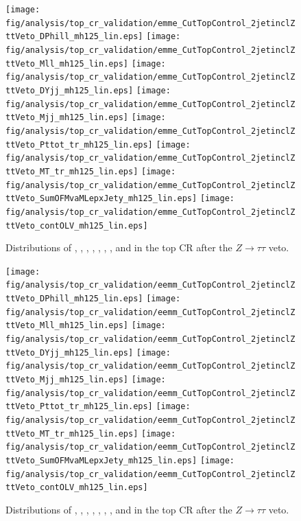 \begin{figure}[h]
  \centering
   \texttt{[image: fig/analysis/top\_cr\_validation/emme\_CutTopControl\_2jetinclZttVeto\_DPhill\_mh125\_lin.eps]}
   \texttt{[image: fig/analysis/top\_cr\_validation/emme\_CutTopControl\_2jetinclZttVeto\_Mll\_mh125\_lin.eps]}
   \texttt{[image: fig/analysis/top\_cr\_validation/emme\_CutTopControl\_2jetinclZttVeto\_DYjj\_mh125\_lin.eps]}
   \texttt{[image: fig/analysis/top\_cr\_validation/emme\_CutTopControl\_2jetinclZttVeto\_Mjj\_mh125\_lin.eps]}
   \texttt{[image: fig/analysis/top\_cr\_validation/emme\_CutTopControl\_2jetinclZttVeto\_Pttot\_tr\_mh125\_lin.eps]}
   \texttt{[image: fig/analysis/top\_cr\_validation/emme\_CutTopControl\_2jetinclZttVeto\_MT\_tr\_mh125\_lin.eps]}
   \texttt{[image: fig/analysis/top\_cr\_validation/emme\_CutTopControl\_2jetinclZttVeto\_SumOFMvaMLepxJety\_mh125\_lin.eps]}
   \texttt{[image: fig/analysis/top\_cr\_validation/emme\_CutTopControl\_2jetinclZttVeto\_contOLV\_mh125\_lin.eps]}
   \caption{Distributions
   of \dphill, \mll, \dyjj, \mjj, \pTtot, \mT, \SumMlj, and \lepEtaCen
   in the \emme top CR after the $Z\rightarrow{\tau\tau}$ veto.}
  \label{chap:analysis:fig:bdt_inputs_topcr_df}
\end{figure}

\begin{figure}[h]
  \centering
  \texttt{[image: fig/analysis/top\_cr\_validation/eemm\_CutTopControl\_2jetinclZttVeto\_DPhill\_mh125\_lin.eps]}
   \texttt{[image: fig/analysis/top\_cr\_validation/eemm\_CutTopControl\_2jetinclZttVeto\_Mll\_mh125\_lin.eps]}
   \texttt{[image: fig/analysis/top\_cr\_validation/eemm\_CutTopControl\_2jetinclZttVeto\_DYjj\_mh125\_lin.eps]}
   \texttt{[image: fig/analysis/top\_cr\_validation/eemm\_CutTopControl\_2jetinclZttVeto\_Mjj\_mh125\_lin.eps]}
   \texttt{[image: fig/analysis/top\_cr\_validation/eemm\_CutTopControl\_2jetinclZttVeto\_Pttot\_tr\_mh125\_lin.eps]}
   \texttt{[image: fig/analysis/top\_cr\_validation/eemm\_CutTopControl\_2jetinclZttVeto\_MT\_tr\_mh125\_lin.eps]}
   \texttt{[image: fig/analysis/top\_cr\_validation/eemm\_CutTopControl\_2jetinclZttVeto\_SumOFMvaMLepxJety\_mh125\_lin.eps]}
   \texttt{[image: fig/analysis/top\_cr\_validation/eemm\_CutTopControl\_2jetinclZttVeto\_contOLV\_mh125\_lin.eps]}
   \caption{Distributions
   of \dphill, \mll, \dyjj, \mjj, \pTtot, \mT, \SumMlj, and \lepEtaCen
   in the \eemm top CR after the $Z\rightarrow{\tau\tau}$ veto.}
  \label{chap:analysis:fig:bdt_inputs_topcr_sf}
\end{figure}

